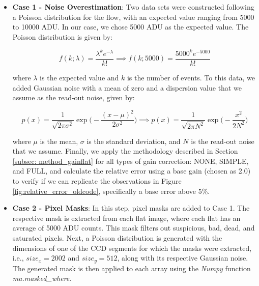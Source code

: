 \begin{itemize}
    \item \textbf{Case 1 - Noise Overestimation}: Two data sets were constructed following a Poisson distribution for the flow, with an expected value ranging from 5000 to 10000 ADU. In our case, we chose 5000 ADU as the expected value. The Poisson distribution is given by:
 
    \begin{equation}
        f(k;\lambda) = \frac{\lambda^k e^{-\lambda}}{k!} \implies f(k;5000) = \frac{5000^k e^{-5000}}{k!}
    \end{equation}
    \label{eq:dist_Poisson}

    where $\lambda$ is the expected value and $k$ is the number of events. To this data, we added Gaussian noise with a mean of zero and a dispersion value that we assume as the read-out noise, given by:
    
    \begin{equation}
        p(x) = \frac{1}{\sqrt{2 \pi \sigma^2}} \exp \Big(-\frac{(x - \mu)^2}{2\sigma^2} \Big) \implies p(x) = \frac{1}{\sqrt{2 \pi N^2}} \exp \Big(-\frac{x^2}{2N^2} \Big)
        \label{eq:gaussian_noise}
    \end{equation}
    
    where $\mu$ is the mean, $\sigma$ is the standard deviation, and $N$ is the read-out noise that we assume. Finally, we apply the methodology described in Section \ref{subsec: method_gainflat} for all types of gain correction: NONE, SIMPLE, and FULL, and calculate the relative error using a base gain (chosen as 2.0) to verify if we can replicate the observations in Figure \ref{fig:relative_error_oldcode}, specifically a base error above 5\%.

    \item \textbf{Case 2 - Pixel Masks}: In this step, pixel masks are added to Case 1. The respective mask is extracted from each flat image, where each flat has an average of 5000 ADU counts. This mask filters out suspicious, bad, dead, and saturated pixels. Next, a Poisson distribution is generated with the dimensions of one of the CCD segments for which the masks were extracted, i.e., $size_x = 2002$ and $size_y = 512$, along with its respective Gaussian noise. The generated mask is then applied to each array using the \textit{Numpy} function \citep{2020Natur.585..357H} \textit{ma.masked\_where}.


\end{itemize}

